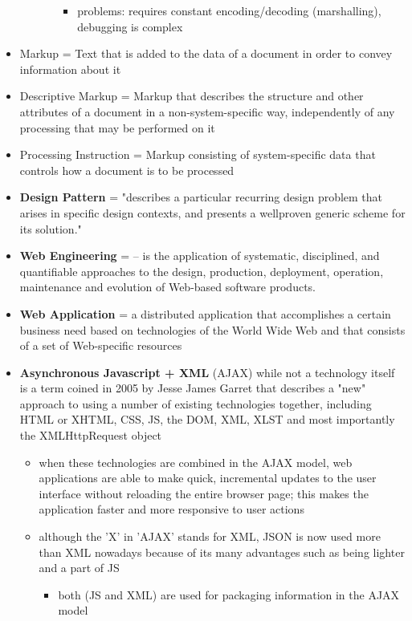 \documentclass[11pt]{article}
\begin{document}
\begin{itemize}
\begin{itemize}
\begin{itemize}
\begin{itemize}
\item problems: requires constant encoding/decoding (marshalling), debugging is complex
\end{itemize}
\end{itemize}
\end{itemize}
\item Markup = Text that is added to the data of a document in order to convey information about it
\item Descriptive Markup = Markup that describes the structure and other attributes of a document in a non-system-specific way, independently of any processing that may be performed on it
\item Processing Instruction = Markup consisting of system-specific data that controls how a document is to be processed
\item \textbf{Design Pattern} = "describes a particular recurring design problem that arises in specific design contexts, and presents a wellproven generic scheme for its solution."
\item \textbf{Web Engineering} = – is the application of systematic, disciplined, and quantifiable approaches to the design, production, deployment, operation, maintenance and evolution of Web-based software products.
\item \textbf{Web Application} = a distributed application that accomplishes a certain business need based on technologies of the World Wide Web and that consists of a set of Web-specific resources
\item \textbf{Asynchronous Javascript + XML} (AJAX) while not a technology itself is a term coined in 2005 by Jesse James Garret that describes a "new" approach to using a number of existing technologies together, including HTML or XHTML, CSS, JS, the DOM, XML, XLST and most importantly the XMLHttpRequest object
\begin{itemize}
\item when these technologies are combined in the AJAX model, web applications are able to make quick, incremental updates to the user interface without reloading the entire browser page; this makes the application faster and more responsive to user actions
\item although the 'X' in 'AJAX' stands for XML, JSON is now used more than XML nowadays because of its many advantages such as being lighter and a part of JS
\begin{itemize}
\item both (JS and XML) are used for packaging information in the AJAX model

\end{itemize}
\end{itemize}
\end{itemize}
\end{document}

